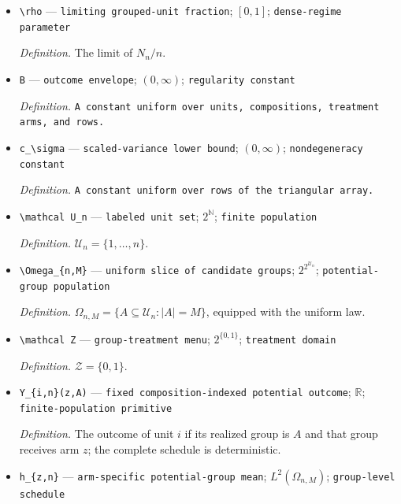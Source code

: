 \documentclass{article}
\begin{document}
\begin{itemize}
  \item \texttt{\textbackslash{}\allowbreak{}rho} --- \texttt{limiting grouped-\allowbreak{}unit fraction}; \([0,1]\); \texttt{dense-\allowbreak{}regime parameter}
  \par\smallskip\noindent\emph{Definition.} The limit of \(N_n/n\).
  \item \texttt{B} --- \texttt{outcome envelope}; \((0,\infty)\); \texttt{regularity constant}
  \par\smallskip\noindent\emph{Definition.} \texttt{A constant uniform over units,\allowbreak{} compositions,\allowbreak{} treatment arms,\allowbreak{} and rows.}
  \item \texttt{c\_\allowbreak{}\textbackslash{}\allowbreak{}sigma} --- \texttt{scaled-\allowbreak{}variance lower bound}; \((0,\infty)\); \texttt{nondegeneracy constant}
  \par\smallskip\noindent\emph{Definition.} \texttt{A constant uniform over rows of the triangular array.}
  \item \texttt{\textbackslash{}\allowbreak{}mathcal U\_\allowbreak{}n} --- \texttt{labeled unit set}; \(2^{\mathbb N}\); \texttt{finite population}
  \par\smallskip\noindent\emph{Definition.} \(\mathcal U_n=\{1,\ldots,n\}\).
  \item \texttt{\textbackslash{}\allowbreak{}Omega\_\allowbreak{}\{n,\allowbreak{}M\}\allowbreak{}} --- \texttt{uniform slice of candidate groups}; \(2^{2^{\mathcal U_n}}\); \texttt{potential-\allowbreak{}group population}
  \par\smallskip\noindent\emph{Definition.} \(\Omega_{n,M}=\{A\subseteq\mathcal U_n:|A|=M\}\), equipped with the uniform law.
  \item \texttt{\textbackslash{}\allowbreak{}mathcal Z} --- \texttt{group-\allowbreak{}treatment menu}; \(2^{\{0,1\}}\); \texttt{treatment domain}
  \par\smallskip\noindent\emph{Definition.} \(\mathcal Z=\{0,1\}\).
  \item \texttt{Y\_\allowbreak{}\{i,\allowbreak{}n\}\allowbreak{}(z,\allowbreak{}A)} --- \texttt{fixed composition-\allowbreak{}indexed potential outcome}; \(\mathbb R\); \texttt{finite-\allowbreak{}population primitive}
  \par\smallskip\noindent\emph{Definition.} The outcome of unit \(i\) if its realized group is \(A\) and that group receives arm \(z\); the complete schedule is deterministic.
  \item \texttt{h\_\allowbreak{}\{z,\allowbreak{}n\}\allowbreak{}} --- \texttt{arm-\allowbreak{}specific potential-\allowbreak{}group mean}; \(L^2(\Omega_{n,M})\); \texttt{group-\allowbreak{}level schedule}

\end{itemize}
\end{document}
